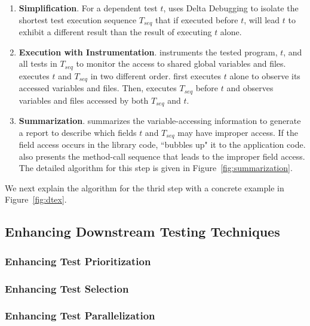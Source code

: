 \begin{enumerate}
\item \textbf{Simplification}. For a dependent test $t$,
\dtexplain uses Delta Debugging to isolate the shortest test
execution sequence $T_{seq}$ that if executed before $t$, will lead
$t$ to exhibit a different result than the result of
executing $t$ alone.

\item \textbf{Execution with Instrumentation}. \dtexplain instruments
the tested program, $t$, and all tests in $T_{seq}$ to monitor
the access to shared global variables and files. \dtexplain 
executes $t$ and $T_{seq}$ in two different order. \dtexplain
first executes $t$ alone to observe its accessed variables
and files. Then, \dtexplain executes $T_{seq}$ before $t$
and observes variables and files accessed by both $T_{seq}$
and $t$.

\item \textbf{Summarization}. \dtexplain summarizes the
variable-accessing information to generate a report to describe
which fields $t$ and $T_{seq}$ may have improper access.
If the field access occurs in the library code, \dtexplain
``bubbles up" it to the application code.
\dtexplain also presents the method-call sequence
that leads to the improper field access. The detailed
algorithm for this step is given in Figure~\ref{fig:summarization}.
\end{enumerate}

We next explain the algorithm for the thrid step with
a concrete example in Figure~\ref{fig:dtex}.


\subsection{Enhancing Downstream Testing Techniques}
\label{sec:copeenhance}

\subsubsection{Enhancing Test Prioritization}

\subsubsection{Enhancing Test Selection}

\subsubsection{Enhancing Test Parallelization}

